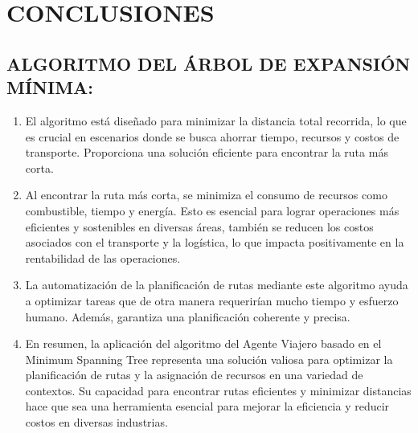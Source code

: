 \documentclass{article}
\begin{document}

\section{CONCLUSIONES}
\subsection{ALGORITMO DEL ÁRBOL DE EXPANSIÓN MÍNIMA:}
\begin{enumerate}
  \item El algoritmo está diseñado para minimizar la distancia total recorrida, lo que es crucial en escenarios donde se busca ahorrar tiempo, recursos y costos de transporte. Proporciona una solución eficiente para encontrar la ruta más corta.
  \item Al encontrar la ruta más corta, se minimiza el consumo de recursos como combustible, tiempo y energía. Esto es esencial para lograr operaciones más eficientes y sostenibles en diversas áreas, también se reducen los costos asociados con el transporte y la logística, lo que impacta positivamente en la rentabilidad de las operaciones.
  \item La automatización de la planificación de rutas mediante este algoritmo ayuda a optimizar tareas que de otra manera requerirían mucho tiempo y esfuerzo humano. Además, garantiza una planificación coherente y precisa.
  \item En resumen, la aplicación del algoritmo del Agente Viajero basado en el Minimum Spanning Tree representa una solución valiosa para optimizar la planificación de rutas y la asignación de recursos en una variedad de contextos. Su capacidad para encontrar rutas eficientes y minimizar distancias hace que sea una herramienta esencial para mejorar la eficiencia y reducir costos en diversas industrias.
\end{enumerate}
\end{document}
